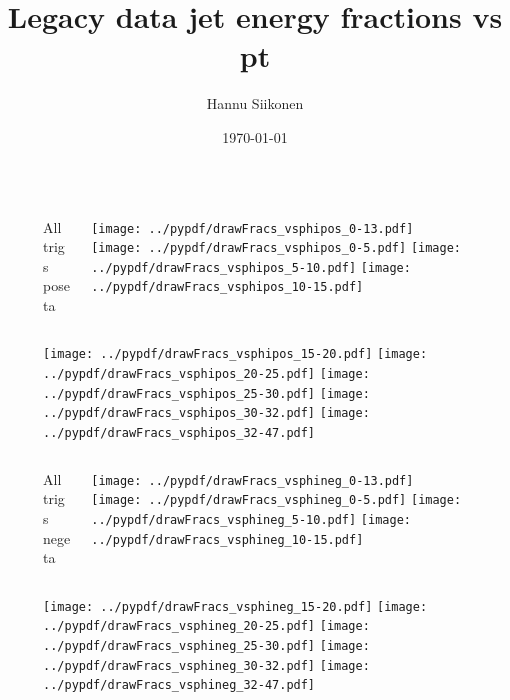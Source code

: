 \documentclass[aspectratio=169]{beamer}
\title[Legacy data jet energy fractions vs pt]{Legacy data jet energy fractions vs pt}
\author{Hannu Siikonen}
\institute{Helsinki Institute of Physics \\ \vspace{0.25cm} Instructor Adj.~Prof.~Mikko~Voutilainen}
\date{\today}
\begin{document}
\titlepage

\newpage

\begin{figure}[p]
\flushleft
\begin{columns}[T]
\begin{column}{.2\linewidth}
\centering
All trigs poseta
\end{column}
\begin{column}{.8\linewidth}
\texttt{[image: ../pypdf/drawFracs\_vsphipos\_0-13.pdf]}
\texttt{[image: ../pypdf/drawFracs\_vsphipos\_0-5.pdf]}
\texttt{[image: ../pypdf/drawFracs\_vsphipos\_5-10.pdf]}
\texttt{[image: ../pypdf/drawFracs\_vsphipos\_10-15.pdf]}
\end{column}
\end{columns}
\texttt{[image: ../pypdf/drawFracs\_vsphipos\_15-20.pdf]}
\texttt{[image: ../pypdf/drawFracs\_vsphipos\_20-25.pdf]}
\texttt{[image: ../pypdf/drawFracs\_vsphipos\_25-30.pdf]}
\texttt{[image: ../pypdf/drawFracs\_vsphipos\_30-32.pdf]}
\texttt{[image: ../pypdf/drawFracs\_vsphipos\_32-47.pdf]}
\end{figure}


\begin{figure}[p]
\flushleft
\begin{columns}[T]
\begin{column}{.2\linewidth}
\centering
All trigs negeta
\end{column}
\begin{column}{.8\linewidth}
\texttt{[image: ../pypdf/drawFracs\_vsphineg\_0-13.pdf]}
\texttt{[image: ../pypdf/drawFracs\_vsphineg\_0-5.pdf]}
\texttt{[image: ../pypdf/drawFracs\_vsphineg\_5-10.pdf]}
\texttt{[image: ../pypdf/drawFracs\_vsphineg\_10-15.pdf]}
\end{column}
\end{columns}
\texttt{[image: ../pypdf/drawFracs\_vsphineg\_15-20.pdf]}
\texttt{[image: ../pypdf/drawFracs\_vsphineg\_20-25.pdf]}
\texttt{[image: ../pypdf/drawFracs\_vsphineg\_25-30.pdf]}
\texttt{[image: ../pypdf/drawFracs\_vsphineg\_30-32.pdf]}
\texttt{[image: ../pypdf/drawFracs\_vsphineg\_32-47.pdf]}
\end{figure}
\end{document}
